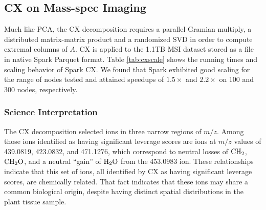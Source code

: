 \subsection{CX on Mass-spec Imaging}
\begin{table}[t]
\begin{center}
\end{center}
\caption{Spark CX running times}
\label{tab:cxscale}
\end{table}
Much like PCA, the CX decomposition requires a parallel Gramian multiply, a distributed matrix-matrix product and a randomized SVD in order to compute extremal columns of $A$. CX is applied to the 1.1TB MSI dataset stored as a file in native Spark Parquet format. Table \ref{tab:cxscale} shows the running times and scaling behavior of Spark CX. We found that Spark exhibited good scaling for the range of nodes tested and attained speedups of $1.5\times$ and $2.2\times$ on 100 and 300 nodes, respectively. 
\subsubsection{Science Interpretation}
 The CX decomposition selected ions in three narrow regions of $m/z$. Among those ions identified as having significant leverage scores are ions at $m/z$ values of 439.0819, 423.0832, and 471.1276, which correspond to neutral losses of $\rm{CH_2}$, $\rm{CH_2O}$, and a neutral ``gain'' of $\rm{H_2O}$ from the 453.0983 ion.  These relationships indicate that this set of ions, all identified by CX as having significant leverage scores, are chemically related.  That fact indicates that these ions may share a common biological origin, despite having distinct spatial distributions in the plant tissue sample.  

